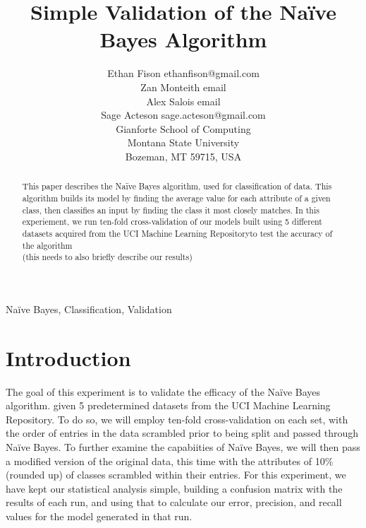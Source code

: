 \documentclass[twoside,11pt]{article}
\begin{document}
\title{Simple Validation of the Naïve Bayes Algorithm}

\author{\name Ethan Fison \email ethanfison@gmail.com \\
        \name Zan Monteith \email email \\
        \name Alex Salois \email email \\ 
        \name Sage Acteson \email sage.acteson@gmail.com \\ 
       \addr Gianforte School of Computing\\
       Montana State University\\
       Bozeman, MT 59715, USA}



\maketitle

\begin{abstract}%
This paper describes the Na{\"i}ve Bayes algorithm, used for classification
of data. This algorithm builds its model by finding the average value for each
attribute of a given class, then classifies an input by finding the class it 
most closely matches. In this experiement, we run ten-fold cross-validation 
of our models built using 5 different datasets acquired from the UCI Machine 
Learning Repositoryto test the accuracy of the algorithm\\
(this needs to also briefly describe our results)

\end{abstract}

\begin{keywords}
  Na{\"i}ve Bayes, Classification, Validation
\end{keywords}

\section{Introduction}

The goal of this experiment is to validate the efficacy of the Naïve Bayes 
algorithm. given 5 predetermined datasets from the UCI Machine Learning Repository.
To do so, we will employ ten-fold cross-validation on each set, with the order of 
entries in the data scrambled prior to being split and passed through Naïve Bayes.
To further examine the capabiities of Naïve Bayes, we will then pass a modified 
version of the original data, this time with the attributes of 10\% (rounded up) of 
classes scrambled within their entries. For this experiment, we have kept our 
statistical analysis simple, building a confusion matrix with the results of each run,
and using that to calculate our error, precision, and recall values for the model 
generated in that run.\\
\end{document}
